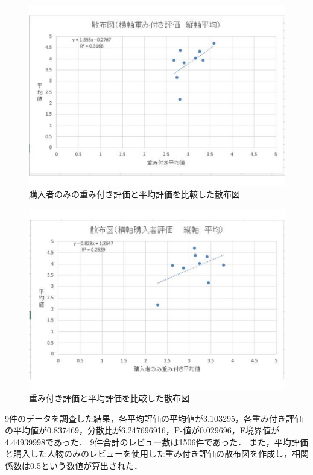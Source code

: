 \begin{figure}[htbp]

\centering
\includegraphics[width=12cm,clip]{sanpuzu3.pdf}
\caption{購入者のみの重み付き評価と平均評価を比較した散布図}
\label{sanpuzu3}

\end{figure}

\begin{figure}[htbp]

\centering
\includegraphics[width=12cm,clip]{sanpuzu4.pdf}
\caption{重み付き評価と平均評価を比較した散布図}
\label{sanpuzu4}

\end{figure}



\clearpage



9件のデータを調査した結果，各平均評価の平均値が3.103295，各重み付き評価の平均値が0.837469，分散比が6.247696916，P-値が0.029696，F境界値が4.44939998であった．
9件合計のレビュー数は1506件であった．
また，平均評価と購入した人物のみのレビューを使用した重み付き評価の散布図を作成し，相関係数は0.5という数値が算出された．

